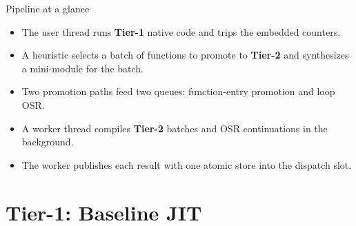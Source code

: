 \documentclass[aspectratio=169,11pt]{beamer}
\newcommand{\tone}{\textbf{\textcolor{tier1}{Tier-1}}}
\newcommand{\ttwo}{\textbf{\textcolor{tier2}{Tier-2}}}
\begin{document}
\begin{frame}{Pipeline at a glance}
  \begin{itemize}\setlength{\itemsep}{4pt}
    \item The user thread runs \tone{} native code and trips the embedded counters.
    \item A heuristic selects a batch of functions to promote to \ttwo{} and synthesizes a mini-module for the batch.
    \item Two promotion paths feed two queues: function-entry promotion and loop OSR.
    \item A worker thread compiles \ttwo{} batches and OSR continuations in the background.
    \item The worker publishes each result with one atomic store into the dispatch slot.
  \end{itemize}
\end{frame}

\section{Tier-1: Baseline JIT}
\end{document}
